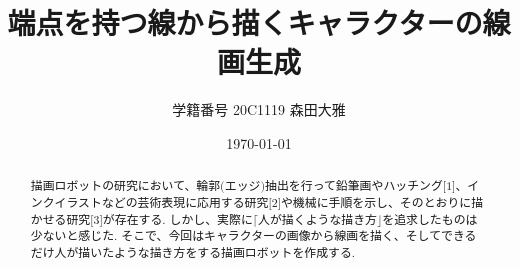 \documentclass[a4j]{jarticle}			%
\title{端点を持つ線から描くキャラクターの線画生成}
\author{学籍番号 20C1119 森田大雅}
\date{\today}
\begin{document}
\maketitle %
\small


\begin{abstract}
描画ロボットの研究において、輪郭$\lparen\text{エッジ}\rparen$抽出を行って鉛筆画やハッチング$\lbrack1\rbrack$、インクイラストなどの芸術表現に応用する研究$\lbrack2\rbrack$や機械に手順を示し、そのとおりに描かせる研究$\lbrack3\rbrack$が存在する.
しかし、実際に$\lceil \text{人が描くような描き方} \rfloor$を追求したものは少ないと感じた.
そこで、今回はキャラクターの画像から線画を描く、そしてできるだけ人が描いたような描き方をする描画ロボットを作成する.
\end{abstract}
\end{document}
